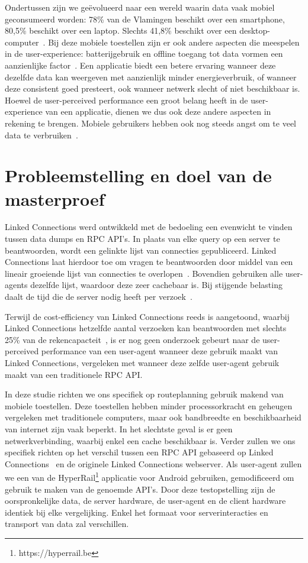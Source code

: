 Ondertussen zijn we geëvolueerd naar een wereld waarin data vaak mobiel geconsumeerd worden: 78\% van de Vlamingen beschikt over een smartphone, 80,5\% beschikt over een laptop. Slechts 41,8\% beschikt over een desktop-computer~\citep{digimeter17}. Bij deze mobiele toestellen zijn er ook andere aspecten die meespelen in de user-experience: batterijgebruik en offline toegang tot data vormen een aanzienlijke factor~\citep{ickin12}. Een applicatie biedt een betere ervaring wanneer deze dezelfde data kan weergeven met aanzienlijk minder energieverbruik, of wanneer deze consistent goed presteert, ook wanneer netwerk slecht of niet beschikbaar is. Hoewel de user-perceived performance een groot belang heeft in de user-experience van een applicatie, dienen we dus ook deze andere aspecten in rekening te brengen. Mobiele gebruikers hebben ook nog steeds angst om te veel data te verbruiken~\citep{ammelrooy17}.


\section{Probleemstelling en doel van de masterproef}
\label{sec:problem}

Linked Connections werd ontwikkeld met de bedoeling een evenwicht te vinden tussen data dumps en RPC API's. In plaats van elke query op een server te beantwoorden, wordt een gelinkte lijst van connecties gepubliceerd. Linked Connections laat hierdoor toe om vragen te beantwoorden door middel van een lineair groeiende lijst van connecties te overlopen~\citep{colpaert15}. Bovendien gebruiken alle user-agents dezelfde lijst, waardoor deze zeer cachebaar is. Bij stijgende belasting daalt de tijd die de server nodig heeft per verzoek~\citep{colpaert17}.

Terwijl de cost-efficiency van Linked Connections reeds is aangetoond, waarbij Linked Connections hetzelfde aantal verzoeken kan beantwoorden met slechts 25\% van de rekencapacteit~\citep{colpaert17,Melendez17}, is er nog geen onderzoek gebeurt naar de user-perceived performance van een user-agent wanneer deze gebruik maakt van Linked Connections, vergeleken met wanneer deze zelfde user-agent gebruik maakt van een traditionele RPC API. 

In deze studie richten we ons specifiek op routeplanning gebruik makend van mobiele toestellen. Deze toestellen hebben minder processorkracht en geheugen vergeleken met traditionele computers, maar ook bandbreedte en beschikbaarheid van internet zijn vaak beperkt. In het slechtste geval is er geen netwerkverbinding, waarbij enkel een cache beschikbaar is. Verder zullen we ons specifiek richten op het verschil tussen een RPC API gebaseerd op Linked Connections~\citep{colpaert17} en de originele Linked Connections webserver. Als user-agent zullen we een  van de HyperRail\footnote{https://hyperrail.be} applicatie voor Android gebruiken, gemodificeerd om gebruik te maken van de genoemde API's. Door deze testopstelling zijn de oorspronkelijke data, de server hardware, de user-agent en de client hardware identiek bij elke vergelijking. Enkel het formaat voor serverinteracties en transport van data zal verschillen.

